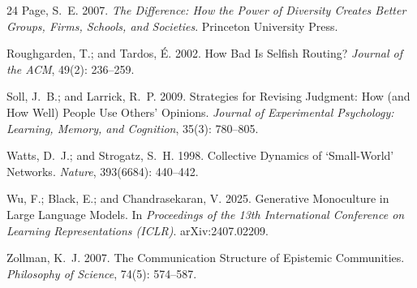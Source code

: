 \documentclass
[letterpaper]{article}
\begin{document}
\begin{thebibliography}{24}
Page, S.~E. 2007.
\newblock \emph{The Difference: How the Power of Diversity Creates Better Groups, Firms, Schools, and Societies}.
\newblock Princeton University Press.

Roughgarden, T.; and Tardos, {\'E}. 2002.
\newblock How Bad Is Selfish Routing?
\newblock \emph{Journal of the ACM}, 49(2): 236--259.

Soll, J.~B.; and Larrick, R.~P. 2009.
\newblock Strategies for Revising Judgment: How (and How Well) People Use Others' Opinions.
\newblock \emph{Journal of Experimental Psychology: Learning, Memory, and Cognition}, 35(3): 780--805.

Watts, D.~J.; and Strogatz, S.~H. 1998.
\newblock Collective Dynamics of `Small-World' Networks.
\newblock \emph{Nature}, 393(6684): 440--442.

Wu, F.; Black, E.; and Chandrasekaran, V. 2025.
\newblock Generative Monoculture in Large Language Models.
\newblock In \emph{Proceedings of the 13th International Conference on Learning Representations (ICLR)}.
\newblock arXiv:2407.02209.

Zollman, K.~J. 2007.
\newblock The Communication Structure of Epistemic Communities.
\newblock \emph{Philosophy of Science}, 74(5): 574--587.

\end{thebibliography}
\end{document}
